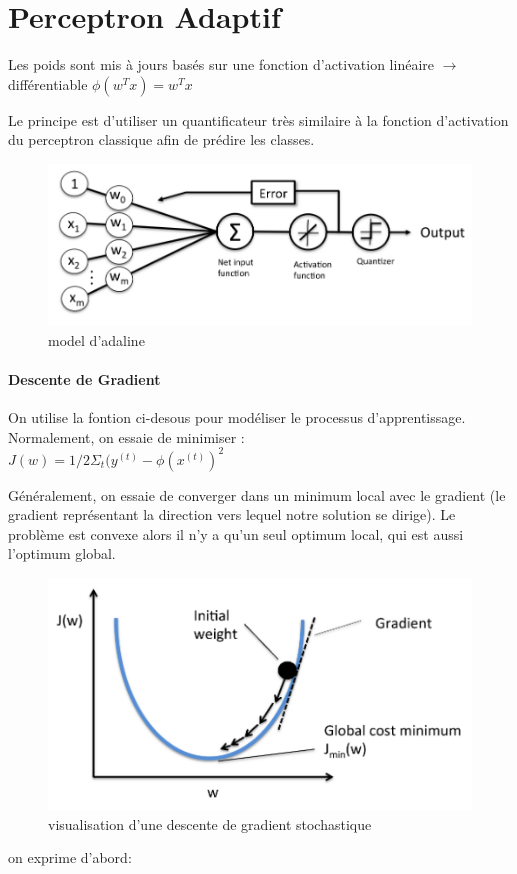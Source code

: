 \documentclass[oneside]{book}
\begin{document}
\section{Perceptron Adaptif}
Les poids sont mis à jours basés sur une fonction d'activation linéaire $\rightarrow$ différentiable
$\phi (w^T x) = w^T x$

Le principe est d'utiliser un quantificateur très similaire à la fonction d'activation du perceptron classique afin de prédire les classes.

\begin{figure}[!ht]
\centering
\includegraphics[width = \linewidth]{adaline.png}
\caption{model d'adaline}
\label{fig:adaline}
\end{figure}

\paragraph{Descente de Gradient}

On utilise la fontion ci-desous pour modéliser le processus d'apprentissage. Normalement, on essaie de minimiser : \\

$J(w) = 1/2 \Sigma _{t} (y^{(t)} - \phi (x^{(t)})^2$

Généralement, on essaie de converger dans un minimum local avec le gradient (le gradient représentant la direction vers lequel notre solution se dirige). Le problème est convexe alors il n'y a qu'un seul optimum local, qui est aussi l'optimum global.\\

\begin{figure}[!ht]
\centering
\includegraphics[width = \linewidth]{SGD.png}
\caption{visualisation d'une descente de gradient stochastique}
\label{fig:SGD}
\end{figure}
 on exprime d'abord:\\
 
\end{document}

